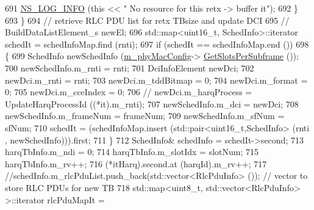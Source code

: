 \begin{DoxyCode}
{691                                                 \hyperlink{group__logging_gafbd73ee2cf9f26b319f49086d8e860fb}{NS\_LOG\_INFO} (\textcolor{keyword}{this} << \textcolor{stringliteral}{" No resource for this retx
       -> buffer it"});
692                                         \}
693                                 \}
694                                 \textcolor{comment}{// retrieve RLC PDU list for retx TBsize and update DCI}
695                                 \textcolor{comment}{//                      BuildDataListElement\_s newEl;}
696                                 std::map<uint16\_t, SchedInfo>::iterator schedIt = schedInfoMap.find (rnti);
697                                 \textcolor{keywordflow}{if} (schedIt == schedInfoMap.end ())
698                                 \{
699                                         SchedInfo newSchedInfo (\hyperlink{classns3_1_1MmWaveMacScheduler_a24d7af4971d2e500fe543cefbafa2fd9}{m\_phyMacConfig}->
      \hyperlink{classns3_1_1MmWavePhyMacCommon_a7b6552d2e0ffbeaf3bc2f9db6d0d6e63}{GetSlotsPerSubframe} ());
700                                         newSchedInfo.m\_rnti = rnti;
701                                         DciInfoElement newDci;
702                                         newDci.m\_rnti = rnti;
703                                         newDci.m\_tddBitmap = 0;
704                                         newDci.m\_format = 0;
705                                         newDci.m\_cceIndex = 0;
706                                         \textcolor{comment}{//                              newDci.m\_harqProcess =
       UpdateHarqProcessId ((*it).m\_rnti);}
707                                         newSchedInfo.m\_dci = newDci;
708                                         newSchedInfo.m\_frameNum = frameNum;
709                                         newSchedInfo.m\_sfNum = sfNum;
710                                         schedIt = (schedInfoMap.insert (std::pair<uint16\_t,SchedInfo> (rnti
      , newSchedInfo))).first;
711                                 \}
712                                 SchedInfo& schedInfo = schedIt->second;
713                                 harqTbInfo.m\_ndi = 0;
714                                 harqTbInfo.m\_slotIdx = slotNum;
715                                 harqTbInfo.m\_rv++;
716                                 (*itHarq).second.at (harqId).m\_rv++;
717                                 \textcolor{comment}{//schedInfo.m\_rlcPduList.push\_back(std::vector<RlcPduInfo> ());  // vector
       to store RLC PDUs for new TB}
718                                 std::map<uint8\_t, std::vector<RlcPduInfo> >::iterator rlcPduMapIt = 
}
\end{DoxyCode}

